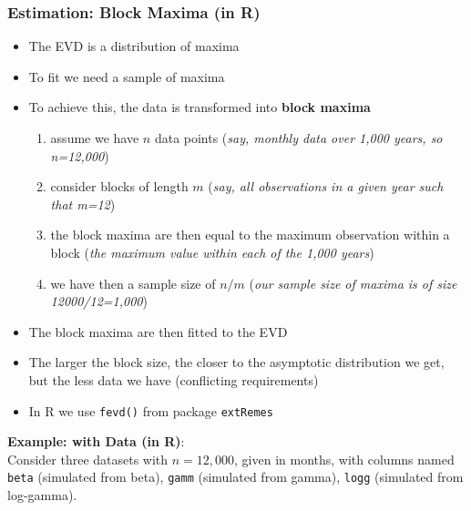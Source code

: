 \documentclass[11pt]{article}
\newcommand{\noi}{\noindent}
\begin{document}
\subsubsection{Estimation: Block Maxima (in R)}
\begin{itemize}
    \item The EVD is a distribution of maxima
    \item To fit we need a sample of maxima
    \item To achieve this, the data is transformed into \textbf{block maxima}
        \begin{enumerate}
            \item assume we have $n$ data points (\textit{say, monthly data over 1,000 years, so n=12,000})
            \item consider blocks of length $m$ (\textit{say, all observations in a given year such that m=12})
            \item the block maxima are then equal to the maximum observation within a block (\textit{the maximum value within each of the 1,000 years})
            \item we have then a sample size of $n/m$ (\textit{our sample size of maxima is of size 12000/12=1,000})
        \end{enumerate}
    \item The block maxima are then fitted to the EVD
    \item The larger the block size, the closer to the asymptotic distribution we get, but the less data we have (conflicting requirements)
    \item In R we use \texttt{fevd()} from package \texttt{extRemes}
\end{itemize} \phantom{i}

\noi \textbf{Example: with Data (in R)}: \\
\noi Consider three datasets with $n=12,000$, given in months, with columns named \texttt{beta} (simulated from beta), \texttt{gamm} (simulated from gamma), \texttt{logg} (simulated from log-gamma). \\
\end{document}
